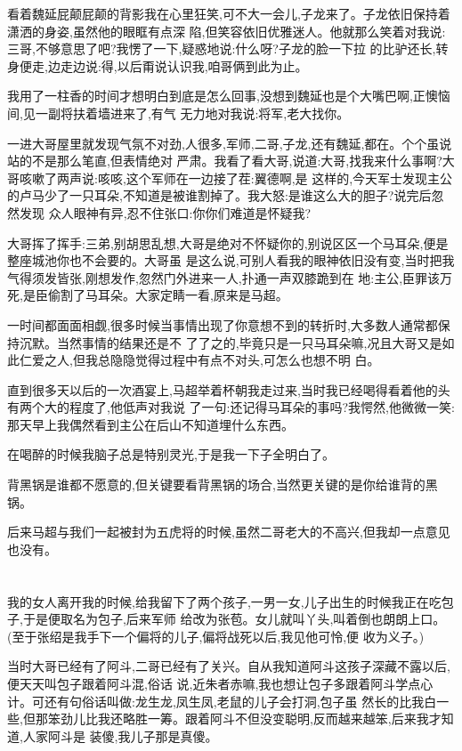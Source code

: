 ﻿\documentclass[12pt,twocolumn]{article}
\begin{document}
看着魏延屁颠屁颠的背影我在心里狂笑,可不大一会儿,子龙来了。子龙依旧保持着潇洒的身姿,虽然他的眼眶有点深
陷,但笑容依旧优雅迷人。他就那么笑着对我说:三哥,不够意思了吧?我愣了一下,疑惑地说:什么呀?子龙的脸一下拉
的比驴还长,转身便走,边走边说:得,以后甭说认识我,咱哥俩到此为止。

我用了一柱香的时间才想明白到底是怎么回事,没想到魏延也是个大嘴巴啊,正懊恼间,见一副将扶着墙进来了,有气
无力地对我说:将军,老大找你。

一进大哥屋里就发现气氛不对劲,人很多,军师,二哥,子龙,还有魏延,都在。个个虽说站的不是那么笔直,但表情绝对
严肃。我看了看大哥,说道:大哥,找我来什么事啊?大哥咳嗽了两声说:咳咳,这个\dldots 军师在一边接了茬:翼德啊,是
这样的,今天军士发现主公的卢马少了一只耳朵,不知道是被谁割掉了。我大怒:是谁这么大的胆子?说完后忽然发现
众人眼神有异,忍不住张口:你\dldots 你们\dldots 难道是怀疑我?

大哥挥了挥手:三弟,别胡思乱想,大哥是绝对不怀疑你的,别说区区一个马耳朵,便是整座城池你也不会要的。大哥虽
是这么说,可别人看我的眼神依旧没有变,当时把我气得须发皆张,刚想发作,忽然门外进来一人,扑通一声双膝跪到在
地:主公,臣罪该万死,是臣偷割了马耳朵。大家定睛一看,原来是马超。

一时间都面面相觑,很多时候当事情出现了你意想不到的转折时,大多数人通常都保持沉默。当然事情的结果还是不
了了之的,毕竟只是一只马耳朵嘛,况且大哥又是如此仁爱之人,但我总隐隐觉得过程中有点不对头,可怎么也想不明
白。

直到很多天以后的一次酒宴上,马超举着杯朝我走过来,当时我已经喝得看着他的头有两个大的程度了,他低声对我说
了一句:还记得马耳朵的事吗?我愕然,他微微一笑:那天早上我偶然看到主公在后山不知道埋什么东西。

在喝醉的时候我脑子总是特别灵光,于是我一下子全明白了。

背黑锅是谁都不愿意的,但关键要看背黑锅的场合,当然更关键的是你给谁背的黑锅。

后来马超与我们一起被封为五虎将的时候,虽然二哥老大的不高兴,但我却一点意见也没有。

\section{}

我的女人离开我的时候,给我留下了两个孩子,一男一女,儿子出生的时候我正在吃包子,于是便取名为包子,后来军师
给改为张苞。女儿就叫丫头,叫着倒也朗朗上口。(至于张绍是我手下一个偏将的儿子,偏将战死以后,我见他可怜,便
收为义子。)

当时大哥已经有了阿斗,二哥已经有了关兴。自从我知道阿斗这孩子深藏不露以后,便天天叫包子跟着阿斗混,俗话
说,近朱者赤嘛,我也想让包子多跟着阿斗学点心计。可还有句俗话叫做:龙生龙,凤生凤,老鼠的儿子会打洞,包子虽
然长的比我白一些,但那笨劲儿比我还略胜一筹。跟着阿斗不但没变聪明,反而越来越笨,后来我才知道,人家阿斗是
装傻,我儿子那是真傻。
\end{document}
